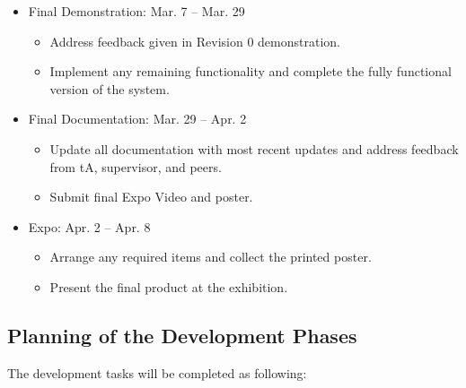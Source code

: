 \documentclass[12pt]{article}
\begin{document}
\begin{itemize}
  \item Final Demonstration: Mar. 7 -- Mar. 29 
  \begin{itemize}
    \item Address feedback given in Revision 0 demonstration.
    \item Implement any remaining functionality and complete the fully functional version of the system.
  \end{itemize}

  \item Final Documentation: Mar. 29 -- Apr. 2 
  \begin{itemize}
    \item Update all documentation with most recent updates and address feedback from tA, supervisor, and peers.
    \item Submit final Expo Video and poster.
  \end{itemize}

  \item Expo: Apr. 2 -- Apr. 8 
  \begin{itemize}
    \item Arrange any required items and collect the printed poster. 
    \item Present the final product at the exhibition.
  \end{itemize}
\end{itemize}
\subsection{Planning of the Development Phases}

The development tasks will be completed as following: 
\end{document}
